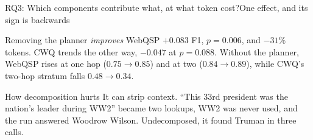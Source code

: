 \begin{frame}{RQ3: Which components contribute what, at what token cost?}{One effect, and its sign is backwards}
  \bodyshift{1.75pt}
  \begin{block}{Removing the planner \emph{improves} WebQSP}
    \small\agrraggedright
    $+0.083$ F1, $p = 0.006$, and $-31\%$ tokens. CWQ trends the other
    way, $-0.047$ at $p = 0.088$. Without the planner, WebQSP rises at one
    hop ($0.75 \to 0.85$) and at two ($0.84 \to 0.89$), while CWQ's two-hop
    stratum falls $0.48 \to 0.34$.
  \end{block}
  \vspace{1mm}
  \begin{block}{How decomposition hurts}
    \small\agrraggedright
    It can strip context. ``This 33rd president was the nation's leader
    during WW2'' became two lookups, WW2 was never used, and the run
    answered Woodrow Wilson. Undecomposed, it found Truman in three calls.
  \end{block}
\end{frame}

